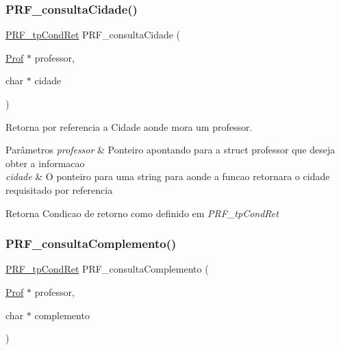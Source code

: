\subsubsection{\texorpdfstring{P\+R\+F\+\_\+consulta\+Cidade()}{PRF\_consultaCidade()}}
{\footnotesize\ttfamily \hyperlink{group__modulo_professor_ga777e215896d573d2e99d98793b1f0ed1}{P\+R\+F\+\_\+tp\+Cond\+Ret} P\+R\+F\+\_\+consulta\+Cidade (\begin{DoxyParamCaption}\item[{\hyperlink{structprof}{Prof} $\ast$}]{professor,  }\item[{char $\ast$}]{cidade }\end{DoxyParamCaption})}



Retorna por referencia a Cidade aonde mora um professor. 


\begin{DoxyParams}{Parâmetros}
{\em professor} & Ponteiro apontando para a struct professor que deseja obter a informacao \\
\hline
{\em cidade} & O ponteiro para uma string para aonde a funcao retornara o cidade requisitado por referencia \\
\hline
\end{DoxyParams}
\begin{DoxyReturn}{Retorna}
Condicao de retorno como definido em {\itshape P\+R\+F\+\_\+tp\+Cond\+Ret} 
\end{DoxyReturn}
\mbox{\label{group__funcoes_consulta_gab09104ea8ee52509a53b8d548441a120}} 
\subsubsection{\texorpdfstring{P\+R\+F\+\_\+consulta\+Complemento()}{PRF\_consultaComplemento()}}
{\footnotesize\ttfamily \hyperlink{group__modulo_professor_ga777e215896d573d2e99d98793b1f0ed1}{P\+R\+F\+\_\+tp\+Cond\+Ret} P\+R\+F\+\_\+consulta\+Complemento (\begin{DoxyParamCaption}\item[{\hyperlink{structprof}{Prof} $\ast$}]{professor,  }\item[{char $\ast$}]{complemento }\end{DoxyParamCaption})}



